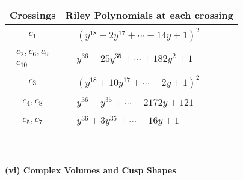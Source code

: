 \documentclass[1p]{elsarticle_modified}
\theoremstyle{definition}
\begin{document}
\begin{tabular}{m{50pt}|m{274pt}}
Crossings & \hspace{64pt}Riley Polynomials at each crossing \\
\hline $$\begin{aligned}c_{1}\end{aligned}$$&$\begin{aligned}
&(y^{18}-2 y^{17}+\cdots-14 y+1)^{2}
\end{aligned}$\\
\hline $$\begin{aligned}c_{2},c_{6},c_{9}\\c_{10}\end{aligned}$$&$\begin{aligned}
&y^{36}-25 y^{35}+\cdots+182 y^2+1
\end{aligned}$\\
\hline $$\begin{aligned}c_{3}\end{aligned}$$&$\begin{aligned}
&(y^{18}+10 y^{17}+\cdots-2 y+1)^{2}
\end{aligned}$\\
\hline $$\begin{aligned}c_{4},c_{8}\end{aligned}$$&$\begin{aligned}
&y^{36}- y^{35}+\cdots-2172 y+121
\end{aligned}$\\
\hline $$\begin{aligned}c_{5},c_{7}\end{aligned}$$&$\begin{aligned}
&y^{36}+3 y^{35}+\cdots-16 y+1
\end{aligned}$\\
\hline
\end{tabular}\\~\\
\newpage\flushleft \textbf{(vi) Complex Volumes and Cusp Shapes}
\end{document}
